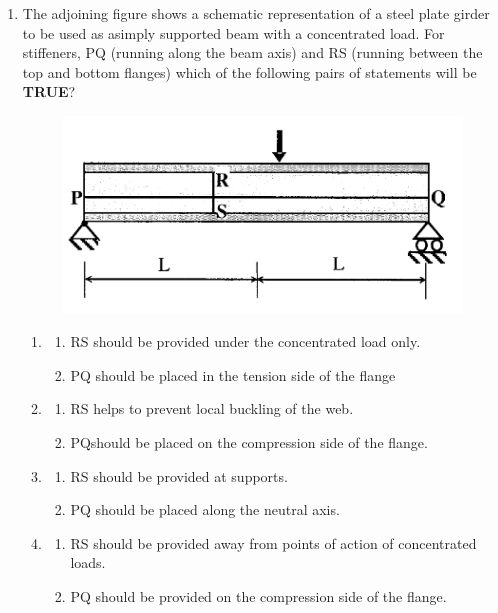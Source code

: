 \documentclass[journal,12pt,onecolumn]{IEEEtran}
\theoremstyle{remark}
\begin{document}
\begin{enumerate}
\item The adjoining figure shows a schematic representation of a steel plate girder to be used as asimply supported beam with a concentrated load. For stiffeners, PQ (running along the beam axis) and RS (running between the top and bottom flanges) which of the following pairs of statements will be \textbf{TRUE}?
\begin{figure}[ht]
\centering
\includegraphics[scale=0.4]{figs/fig4.png}
\end{figure}
	\begin{enumerate}
		\item \begin{enumerate}
				\item RS should be provided under the concentrated load only.
				\item PQ should be placed in the tension side of the flange
			\end{enumerate}
		\item \begin{enumerate}
				\item RS helps to prevent local buckling of the web.
				\item PQshould be placed on the compression side of the flange.
			\end{enumerate}
		\item \begin{enumerate}
				\item RS should be provided at supports.
				\item PQ should be placed along the neutral axis.
			\end{enumerate}
		\item \begin{enumerate}
				\item RS should be provided away from points of action of concentrated loads.
				\item PQ should be provided on the compression side of the flange.
			\end{enumerate}
	\end{enumerate}


\end{enumerate}
\end{document}
